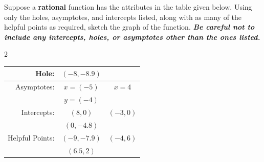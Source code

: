 \documentclass[11pt]{exam}
\newcommand{\version}{SP26A}
\begin{document}
\begin{questions}

\calcfoot        

\newpage


\blankpage
\blankpage

\nocalc{\version}

\setcounter{question}{0}

\question[3] Suppose a \textbf{rational} function has the attributes in the table given below.  Using only the holes, asymptotes, and intercepts listed, along with as many of the helpful points as required, sketch the graph of the function. \textit{\textbf{Be careful not to include any intercepts, holes, or asymptotes other than the ones listed.}}\\

\begin{multicols}{2}
\renewcommand{\arraystretch}{2}
\,\\
\begin{tabular}{ |r|c c| } 
 \hline
 Hole: & $\left(-8,-8.9\right)$ & \\ \hline
 Asymptotes: & $x=(-5)$ & $x=4$ \\
  & $y=(-4)$& \\ \hline
 Intercepts: & $(8,0)$ & $(-3,0)$ \\
 & $(0, -4.8)$ & \\\hline
 Helpful Points: & $(-9,-7.9)$ & $(-4,6)$ \\ 
 & $\left(6.5,2\right)$ & \\
 \hline
\end{tabular}

\columnbreak

    \end{multicols}


\end{questions}
\end{document}
